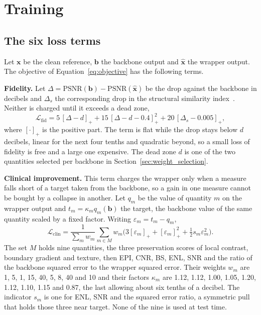 \section{Training}
\label{sec:training}

\subsection{The six loss terms}
\label{sec:loss_terms}
Let $\mathbf{x}$ be the clean reference, $\mathbf{b}$ the backbone output and $\hat{\mathbf{x}}$ the
wrapper output. The objective of Equation~\eqref{eq:objective} has the following terms.

\textbf{Fidelity.} Let $\Delta = \mathrm{PSNR}(\mathbf{b}) - \mathrm{PSNR}(\hat{\mathbf{x}})$ be the
drop against the backbone in decibels and $\Delta_s$ the corresponding drop in the structural
similarity index~\cite{wang2004image}. Neither is charged until it exceeds a dead zone,
\begin{equation}
\mathcal{L}_{\mathrm{fid}} = 5\,[\Delta - d]_+ + 15\,[\Delta - d - 0.4]_+^2
 + 20\,[\Delta_s - 0.005]_+ ,
\label{eq:loss_fid}
\end{equation}
where $[\cdot]_+$ is the positive part. The term is flat while the drop stays below $d$ decibels,
linear for the next four tenths and quadratic beyond, so a small loss of fidelity is free and a large
one expensive. The dead zone $d$ is one of the two quantities selected per backbone in
Section~\ref{sec:weight_selection}.

\textbf{Clinical improvement.} This term charges the wrapper only when a measure falls short of a
target taken from the backbone, so a gain in one measure cannot be bought by a collapse in another.
Let $q_m$ be the value of quantity $m$ on the wrapper output and $t_m = \kappa_m q_m(\mathbf{b})$ the
target, the backbone value of the same quantity scaled by a fixed factor. Writing
$\varepsilon_m = t_m - q_m$,
\begin{equation}
\mathcal{L}_{\mathrm{clin}} = \frac{1}{\sum_m w_m} \sum_{m \in M} w_m
 \Big( 3[\varepsilon_m]_+ + [\varepsilon_m]_+^2 + \tfrac{1}{2} s_m \varepsilon_m^2 \Big).
\label{eq:loss_clin}
\end{equation}
The set $M$ holds nine quantities, the three preservation scores of local contrast, boundary gradient
and texture, then EPI, CNR, BS, ENL, SNR and the ratio of the backbone squared error to the wrapper
squared error. Their weights $w_m$ are 1, 5, 1, 15, 40, 5, 8, 40 and 10 and their factors $\kappa_m$
are 1.12, 1.12, 1.00, 1.05, 1.20, 1.12, 1.10, 1.15 and 0.87, the last allowing about six tenths of a
decibel. The indicator $s_m$ is one for ENL, SNR and the squared error ratio, a symmetric pull that
holds those three near target. None of the nine is used at test time.

